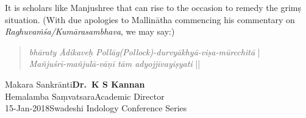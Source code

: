 It is scholars like Manjushree that can rise to the occasion to remedy the grimṣ situation. (With due apologies to Mallinātha commencing his commentary on {\sl Raghuvaṁśa/Kumārasambhava}, we may say:)
\begin{quote}
{{\sl bhāraty Ādikaveḥ Pollāg(Pollock)-durvyākhyā-viṣa-mūrcchitā}} |\\
{\sl Mañjuśrī-mañjulā-vāṇī tām adyojjīvayiṣyati} ||
\end{quote}

\noindent
Makara Sankrānti\hfill	{\bf Dr.~K S Kannan}\\
Hemalamba Saṃvatsara\hfill Academic Director\\
15-Jan-2018\hfill Swadeshi Indology Conference Series

